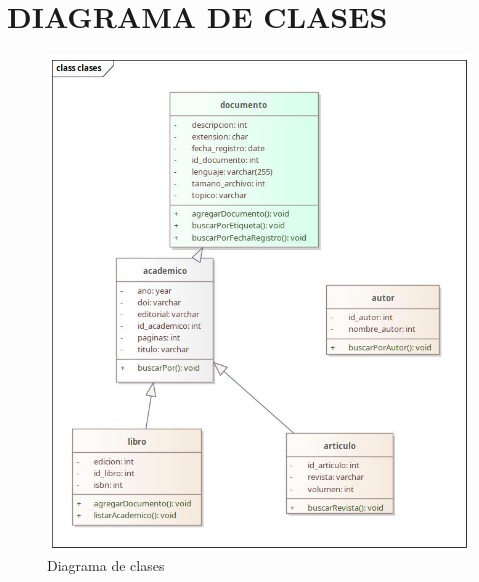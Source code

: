 \chapter*{DIAGRAMA DE CLASES}
\begin{figure}[h]
	\centering
	\includegraphics[scale=0.6]{images/clase}
	\caption{Diagrama de clases }
\end{figure}
